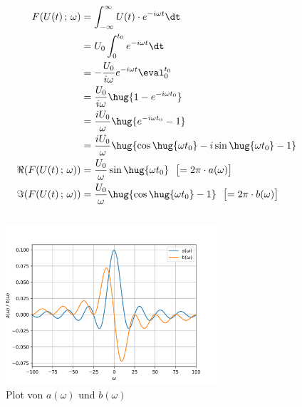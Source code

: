 \documentclass[11pt]{article}
\begin{document}
\subsection{}
\begin{align*}
    F(U(t)\,;\,\omega) &= \int_{-\infty}^{\infty} U(t)\cdot e^{- i \omega t}\dt\\
    &= U_0 \int_{0}^{t_0} e^{- i \omega t}\dt\\
    &= -\frac{U_0}{i \omega}e^{- i \omega t}\eval_{0}^{t_0}\\
    &= \frac{U_0}{i \omega}\hug{1 - e^{- i \omega t_0}}\\
    &= \frac{i U_0}{\omega}\hug{e^{- i \omega t_0} - 1}\\
    &= \frac{i U_0}{\omega}\hug{\cos\hug{\omega t_0} - i\sin\hug{\omega t_0} - 1}\\
    \Re (F(U(t)\,;\,\omega)) &= \frac{U_0}{\omega}\sin\hug{\omega t_0} \ \ \bigl[= 2\pi\cdot  a(\omega )\bigr]\\
    \Im (F(U(t)\,;\,\omega)) &= \frac{U_0}{\omega}\hug{\cos\hug{\omega t_0} - 1} \ \ \bigl[= 2\pi\cdot  b(\omega )\bigr]\\
\end{align*}

\newpage
\subsection{}
\begin{figure}[h]
    \centering
    \includegraphics[width=0.7\textwidth]{5c.png}
    \caption{Plot von \(a(\omega)\) und \(b(\omega)\)}
\end{figure}
\end{document}
